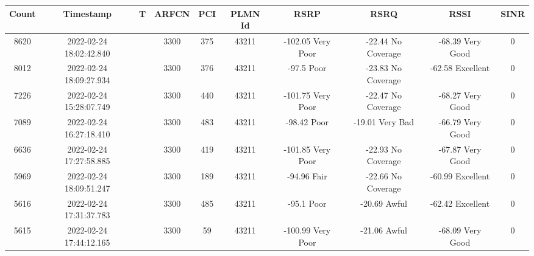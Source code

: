 \begin{longtable*}{|c|c|c|c|c|c|c|c|c|c|}\hline
{}
Count&Timestamp&T&ARFCN&PCI&PLMN Id&RSRP&RSRQ&RSSI&SINR\\\hline\hline
{}8620&2022-02-24 18:02:42.840&&3300&375&43211& -102.05   Very Poor   & -22.44    No Coverage & -68.39    Very Good   & 0\\\hline
{}8012&2022-02-24 18:09:27.934&&3300&376&43211& -97.5     Poor        & -23.83    No Coverage & -62.58    Excellent   & 0\\\hline
{}7226&2022-02-24 15:28:07.749&&3300&440&43211& -101.75   Very Poor   & -22.47    No Coverage & -68.27    Very Good   & 0\\\hline
{}7089&2022-02-24 16:27:18.410&&3300&483&43211& -98.42    Poor        & -19.01    Very Bad    & -66.79    Very Good   & 0\\\hline
{}6636&2022-02-24 17:27:58.885&&3300&419&43211& -101.85   Very Poor   & -22.93    No Coverage & -67.87    Very Good   & 0\\\hline
{}5969&2022-02-24 18:09:51.247&&3300&189&43211& -94.96    Fair        & -22.66    No Coverage & -60.99    Excellent   & 0\\\hline
{}5616&2022-02-24 17:31:37.783&&3300&485&43211& -95.1     Poor        & -20.69    Awful       & -62.42    Excellent   & 0\\\hline
{}5615&2022-02-24 17:44:12.165&&3300&59&43211& -100.99   Very Poor   & -21.06    Awful       & -68.09    Very Good   & 0\\\hline

\end{longtable*}
